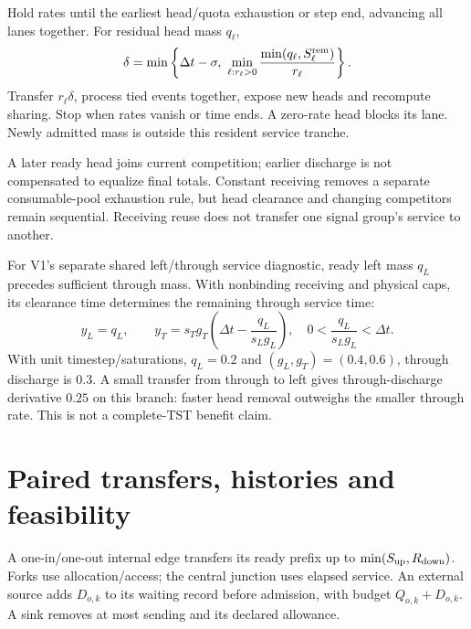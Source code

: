 \documentclass[10pt,a4paper]{article}
\begin{document}
Hold rates until the earliest head/quota exhaustion or step end,
advancing all lanes together. For residual head mass $q_\ell$,
\begin{equation}
 \delta=\min\left\{\Delta t-\sigma,\
 \min_{\ell:r_\ell>0}
       \frac{\min(q_\ell,S_\ell^{\rm rem})}{r_\ell}\right\}.
 \label{eq:head-time}
\end{equation}
Transfer $r_\ell\delta$, process tied events together, expose new heads
and recompute sharing. Stop when rates vanish or time ends.
A zero-rate head blocks its lane. Newly admitted mass is outside this
resident service tranche.

A later ready head joins current competition; earlier discharge is not
compensated to equalize final totals. Constant receiving removes a
separate consumable-pool exhaustion rule, but head clearance and changing
competitors remain sequential. Receiving reuse does not transfer one
signal group's service to another.

For V1's separate shared left/through service diagnostic, ready left
mass $q_L$ precedes sufficient through mass. With nonbinding receiving
and physical caps, its clearance time determines the remaining through
service time:
\begin{equation}
 y_L=q_L,\qquad
 y_T=s_Tg_T\left(\Delta t-\frac{q_L}{s_Lg_L}\right),
 \quad 0<\frac{q_L}{s_Lg_L}<\Delta t.
 \label{eq:head-example}
\end{equation}
With unit timestep/saturations, $q_L=0.2$ and $(g_L,g_T)=(0.4,0.6)$,
through discharge is $0.3$. A small transfer from through to left gives
through-discharge derivative $0.25$ on this branch: faster head removal
outweighs the smaller through rate. This is not a complete-TST benefit claim.

\section{Paired transfers, histories and feasibility}

A one-in/one-out internal edge transfers its ready prefix up to
$\min(S_{\rm up},R_{\rm down})$. Forks use allocation/access; the central
junction uses elapsed service. An external source adds $D_{o,k}$ to its
waiting record before admission, with budget $Q_{o,k}+D_{o,k}$.
A sink removes at most sending and its declared allowance.
\end{document}

